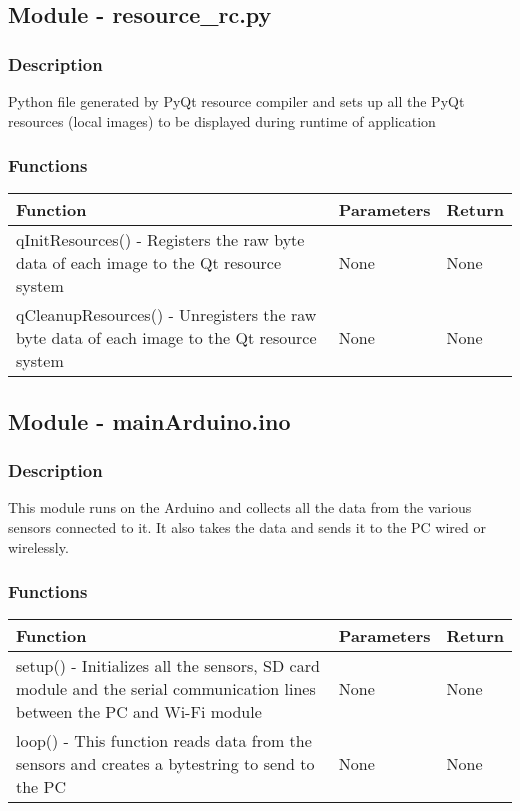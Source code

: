 \documentclass[12pt, titlepage]{article}
\begin{document}
  \subsection{Module - resource\_rc.py}

  \subsubsection{Description}
  Python file generated by PyQt resource compiler and sets up all the PyQt resources (local images) to be displayed during runtime of application
  

  \subsubsection{Functions}
  
    \noindent \begin{tabular}{| p{} | p{}| p{}|}
      \hline
      \rowcolor[gray]{0.9}
      Function & Parameters & Return\\
      \hline
      qInitResources() - Registers the raw byte data of each image to the Qt resource system &  None & None \\
      \hline
      qCleanupResources() - Unregisters the raw byte data of each image to the Qt resource system & None & None \\
      \hline
    \end{tabular}

\newpage
    \subsection{Module - mainArduino.ino}

    \subsubsection{Description}
    This module runs on the Arduino and collects all the data from the various sensors connected to it. It also takes the data and sends it to the PC wired or wirelessly.
    

  \subsubsection{Functions}
    \noindent \begin{tabular}{| p{} | p{}| p{}|}
      \hline
      \rowcolor[gray]{0.9}
      Function & Parameters & Return\\
      \hline
      setup() - Initializes all the sensors, SD card module and the serial communication lines between the PC and Wi-Fi module & None & None \\
      \hline
      loop() - This function reads data from the sensors and creates a bytestring to send to the PC & None & None \\
      \hline
      
    \end{tabular}
\end{document}
